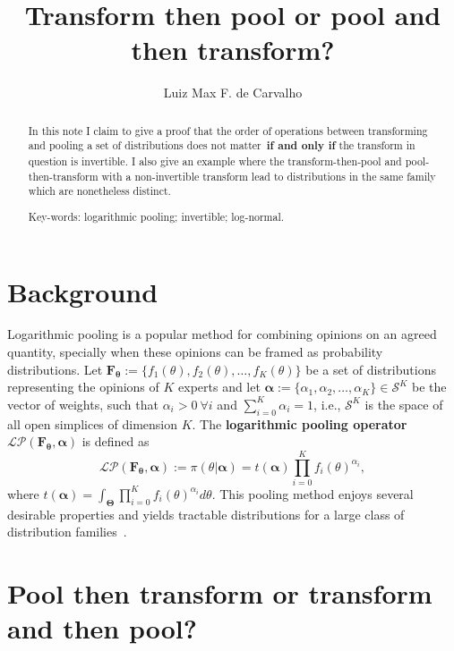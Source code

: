 \documentclass[a4paper, notitlepage, 10pt]{article}
\title{\vspace{-9ex}\centering \bf Transform then pool or pool and then transform?}
\author{
Luiz Max F. de Carvalho\\
}
\begin{document}
\maketitle

\begin{abstract}
In this note I claim to give a proof that the order of operations between transforming and pooling a set of distributions does not matter~\textbf{if and only if} the transform in question is invertible.
I also give an example where the transform-then-pool and pool-then-transform with a non-invertible transform lead to distributions in the same family which are nonetheless distinct.


Key-words: logarithmic pooling; invertible; log-normal. 
\end{abstract}

\section*{Background}

Logarithmic pooling is a popular method for combining opinions on an agreed quantity, specially when these opinions can be framed as probability distributions.
Let $\mathbf{F_\theta} := \{f_1(\theta), f_2(\theta), \ldots, f_K(\theta)\}$ be a set of distributions representing the opinions of $K$ experts and let $\boldsymbol\alpha :=\{\alpha_1, \alpha_2, \ldots, \alpha_K \} \in \mathcal{S}^K$ be the vector of weights, such that $\alpha_i > 0\: \forall i$ and $\sum_{i=0}^K \alpha_i = 1$, i.e., $\mathcal{S}^K$ is the space of all open simplices of dimension $K$.
The \textbf{logarithmic pooling operator} $\mathcal{LP}(\mathbf{F_\theta}, \boldsymbol\alpha)$ is defined as
\begin{equation}
\label{eq:logpool}
 \mathcal{LP}(\mathbf{F_\theta}, \boldsymbol\alpha) :=  \pi(\theta | \boldsymbol\alpha) = t(\boldsymbol\alpha) \prod_{i=0}^K f_i(\theta)^{\alpha_i},
\end{equation}
where $t(\boldsymbol\alpha) = \int_{\boldsymbol\Theta}\prod_{i=0}^K f_i(\theta)^{\alpha_i}d\theta$.
This pooling method enjoys several desirable properties and yields tractable distributions for a large class of distribution families~\citep{genest1984}.

\section*{Pool then transform or transform and then pool?}
\end{document}
